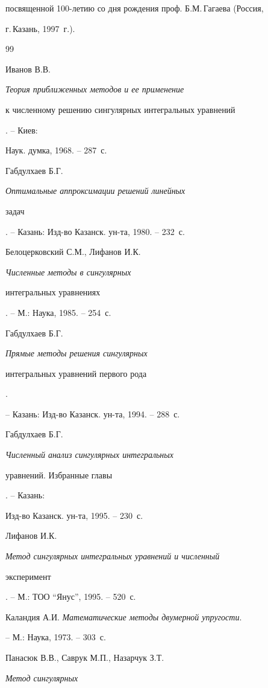 посвященной 100-летию со дня рождения проф. Б.М.\,Гагаева (Россия,


г.\,Казань, 1997~г.).





\begin{thebibliography}{99}







Иванов В.В. {\em Теория приближенных методов и ее применение


к численному решению сингулярных интегральных уравнений}. -- Киев:


Наук. думка, 1968. -- 287~с.




Габдулхаев Б.Г. {\em Оптимальные аппроксимации решений линейных


задач}. -- Казань: Изд-во Казанск. ун-та, 1980. -- 232~с.




Белоцерковский С.М., Лифанов И.К. {\em Численные методы в сингулярных


интегральных уравнениях}. -- М.: Наука, 1985. -- 254~с.




Габдулхаев Б.Г. {\em Прямые методы решения сингулярных


интегральных уравнений первого рода}.


-- Казань: Изд-во Казанск. ун-та, 1994. -- 288~с.




Габдулхаев Б.Г. {\em Численный анализ сингулярных интегральных


уравнений. Избранные главы}. -- Казань:


Изд-во Казанск. ун-та, 1995. -- 230~с.




Лифанов И.К. {\em Метод сингулярных интегральных уравнений и численный


эксперимент}. -- М.: ТОО ``Янус'', 1995. -- 520~с.




Каландия А.И. {\em Математические методы двумерной упругости}.


-- М.: Наука, 1973. -- 303~с.




Панасюк В.В., Саврук М.П., Назарчук З.Т. {\em Метод сингулярных


}
\end{thebibliography}
